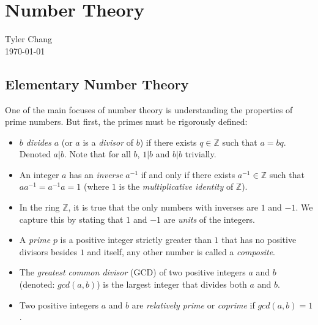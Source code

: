 \documentclass[12pt]{article}
\begin{document}
\section*{Number Theory}
Tyler Chang\\
\today

\subsection*{Elementary Number Theory}

One of the main focuses of number theory is understanding the properties
of prime numbers.
But first, the primes must be rigorously defined:

\begin{itemize}
\item $b$ {\it divides} $a$ (or $a$ is a {\it divisor} of $b$) if there exists 
$q \in \mathbb{Z}$ such that $a = bq$. 
Denoted $a | b$.
Note that for all $b$, $1 | b$ and $b | b$ trivially.
\item An integer $a$ has an {\it inverse} $a^{-1}$ if and only if there exists
$a^{-1}\in\mathbb{Z}$ such that $a a^{-1} = a^{-1} a = 1$ (where $1$ is the 
{\it multiplicative identity} of $\mathbb{Z}$).
\item In the ring $\mathbb{Z}$, it is true that the only numbers with inverses
are $1$ and $-1$.
We capture this by stating that $1$ and $-1$ are {\it units} of the integers.
\item A {\it prime} $p$ is a positive integer strictly greater than $1$ that
has no positive divisors besides $1$ and itself, any other number is called
a {\it composite}.
\item The {\it greatest common divisor} (GCD) of two positive integers
$a$ and $b$ (denoted: $gcd(a,b)$) is the largest integer that divides both 
$a$ and $b$.
\item Two positive integers $a$ and $b$ are {\it relatively prime} or 
{\it coprime} if $gcd(a,b) = 1$.
\end{itemize}
\end{document}
